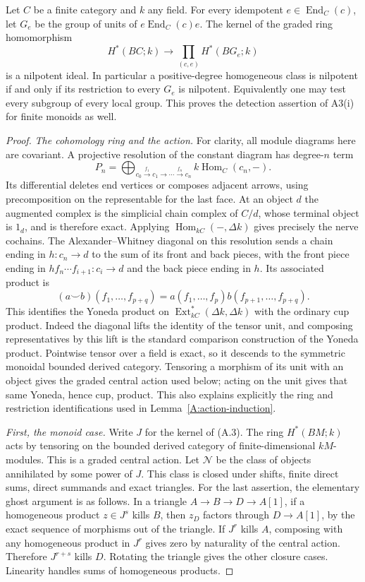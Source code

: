 \begin{theorem}\label{A:detection}
Let $C$ be a finite category and $k$ any field. For every idempotent
$e\in\operatorname{End}_C(c)$, let $G_e$ be the group of units of
$e\operatorname{End}_C(c)e$. The kernel of the graded ring homomorphism
\[
 H^*(BC;k)\longrightarrow\prod_{(c,e)}H^*(BG_e;k)              \tag{A.3}
\]
is a nilpotent ideal. In particular a positive-degree homogeneous class is
nilpotent if and only if its restriction to every $G_e$ is nilpotent.
Equivalently one may test every subgroup of every local group.
This proves the detection assertion of A3(i) for finite monoids as well.
\end{theorem}
\begin{proof}
\emph{The cohomology ring and the action.}
For clarity, all module diagrams here are covariant. A projective resolution
of the constant diagram has degree-$n$ term
\[
 P_n=\bigoplus_{c_0\xrightarrow{f_1}c_1\longrightarrow\cdots
                 \xrightarrow{f_n}c_n} k\operatorname{Hom}_C(c_n,-).
\]
Its differential deletes end vertices or composes adjacent arrows, using
precomposition on the representable for the last face. At an object $d$
the augmented complex is the simplicial chain complex of $C/d$, whose
terminal object is $1_d$, and is therefore exact. Applying
$\operatorname{Hom}_{kC}(-,\Delta k)$ gives precisely the nerve cochains.
The Alexander--Whitney diagonal on this resolution sends a chain ending
in $h:c_n\to d$ to the sum of its front and back pieces, with the front
piece ending in $hf_n\cdots f_{i+1}:c_i\to d$ and the back piece ending
in $h$. Its associated product is
\[
 (a\smile b)(f_1,\ldots,f_{p+q})
   =a(f_1,\ldots,f_p)b(f_{p+1},\ldots,f_{p+q}).
\]
This identifies the Yoneda product on
$\operatorname{Ext}_{kC}^*(\Delta k,\Delta k)$ with the ordinary cup product.
Indeed the diagonal lifts the identity of the tensor unit, and composing
representatives by this lift is the standard comparison construction of
the Yoneda product. Pointwise tensor over a field is exact, so it descends
to the symmetric monoidal bounded derived category. Tensoring a morphism
of its unit with an object gives the graded central action used below;
acting on the unit gives that same Yoneda, hence cup, product. This also
explains explicitly the ring and restriction identifications used in
Lemma~\ref{A:action-induction}.

\emph{First, the monoid case.}
Write $J$ for the kernel of (A.3). The ring $H^*(BM;k)$ acts by tensoring
on the bounded derived category of finite-dimensional $kM$-modules.
This is a graded central action. Let $\mathcal N$ be the class of objects
annihilated by some power of $J$. This class is closed under shifts,
finite direct sums, direct summands and exact triangles. For the last
assertion, the elementary ghost argument is as follows. In a triangle
$A\to B\to D\to A[1]$, if a homogeneous product $z\in J^s$ kills $B$,
then $z_D$ factors through $D\to A[1]$, by the exact sequence of morphisms
out of the triangle. If $J^r$ kills $A$, composing with any homogeneous
product in $J^r$ gives zero by naturality of the central action. Therefore
$J^{r+s}$ kills $D$. Rotating the triangle gives the other closure cases.
Linearity handles sums of homogeneous products.


\end{proof}
